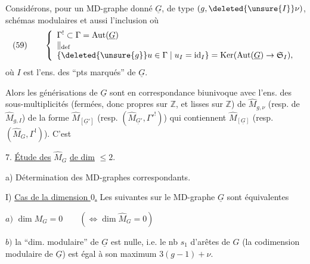 Considérons, pour un MD-graphe donné $\underline{G}$, de type  $(g,\deleted{\unsure{I}}\nu)$,   schémas modulaires 
et aussi l'inclusion
où
\[
\text{(59)}\qquad
\left\{\begin{array}{l}
\Gamma^!\subset\Gamma=\operatorname{Aut}(\underline G)\\
\Vert_{\mathrm{def}}\\
\{\deleted{\unsure{g}}u\in\Gamma\mid u_I=\operatorname{id}_I\}=\operatorname{Ker}(\operatorname{Aut}(\underline G)\to\mathfrak S_I),
\end{array}\right.
\]
où $I$ est l'ens. des ``pts marqués'' de $\underline G$.

Alors les  générisations de $\underline G$ sont en correspondance biunivoque avec l'ens. des sous-multiplicités (fermées,  donc propres sur $\mathbb Z$, et lisses sur $\mathbb Z$) de $\widehat M_{g,\nu}$ (resp. de $\widehat M_{g,I}$) de la forme $\widehat M_{[\underline G']}$ (resp. $(\widehat M_{\underline G'},\Gamma'^!)$) qui contiennent $\widehat M_{[\underline G]}$ (resp. $(\widehat M_G,\Gamma^!)$). C'est

7. \uline{Étude des}  $\widehat M_G$  \uline{de dim} $\leq 2$.

a) Détermination des MD-graphes correspondants.

I) \uline{Cas de la dimension $0$.} Les   suivantes sur le MD-graphe $\underline G$ sont équivalentes

$a)$ $\dim M_G=0\qquad(\Longleftrightarrow\dim\widehat M_G=0)$

$b)$  la ``dim. modulaire'' de $\underline G$ est nulle, i.e. le nb $s_1$ d'arêtes de  $G$ (la codimension modulaire de $\underline G$) est égal à son maximum $3(g-1)+\nu$.

